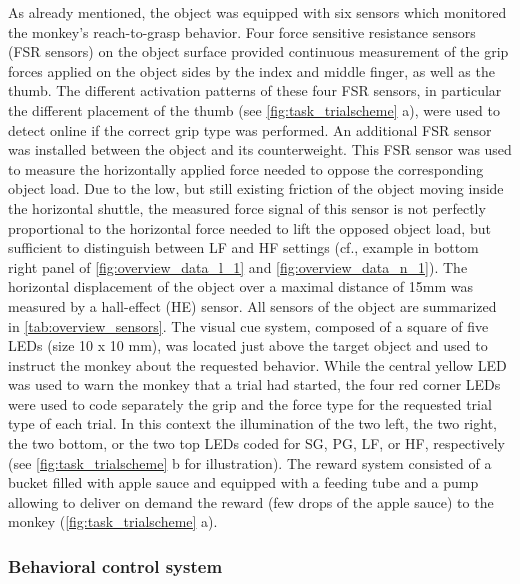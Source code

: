 {As already mentioned, the object was equipped with six sensors which monitored the monkey's reach-to-grasp behavior. Four force sensitive resistance sensors (FSR sensors) on the object surface provided continuous measurement of the grip forces applied on the object sides by the index and middle finger, as well as the thumb. The different activation patterns of these four FSR sensors, in particular the different placement of the thumb (see \cref{fig:task_trialscheme} a), were used to detect online if the correct grip type was performed. An additional FSR sensor was installed between the object and its counterweight. This FSR sensor was used to measure the horizontally applied force needed to oppose the corresponding object load. Due to the low, but still existing friction of the object moving inside the horizontal shuttle, the measured force signal of this sensor is not perfectly proportional to the horizontal force needed to lift the opposed object load, but sufficient to distinguish between LF and HF settings (cf., example in bottom right panel of \ref{fig:overview_data_l_1} and \ref{fig:overview_data_n_1}). The horizontal displacement of the object over a maximal distance of 15mm was measured by a hall-effect (HE) sensor. All sensors of the object are summarized in \cref{tab:overview_sensors}. The visual cue system, composed of a square of five LEDs (size 10 x 10 mm), was located just above the target object and used to instruct the monkey about the requested behavior. While the central yellow LED was used to warn the monkey that a trial had started, the four red corner LEDs were used to code separately the grip and the force type for the requested trial type of each trial. In this context the illumination of the two left, the two right, the two bottom, or the two top LEDs coded for SG, PG, LF, or HF, respectively (see \cref{fig:task_trialscheme} b for illustration). The reward system consisted of a bucket filled with apple sauce and equipped with a feeding tube and a pump allowing to deliver on demand the reward (few drops of the apple sauce) to the monkey (\cref{fig:task_trialscheme} a).

\subsubsection{Behavioral control system}
\label{sec:behavioral_control_system}

}

